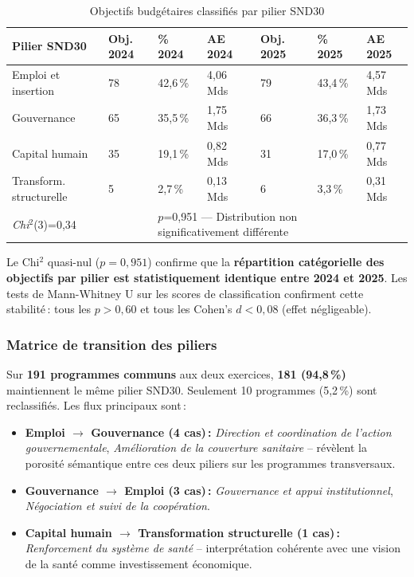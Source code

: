\documentclass[12pt, a4paper]{article}
\begin{document}
\begin{table}[H]
\centering
\caption{Objectifs budgétaires classifiés par pilier SND30}
\label{tab:snd30}
\small
\begin{tabularx}{\linewidth}{lXXXXXX}
\toprule
\rowcolor{bleuCMR!15}
\textbf{Pilier SND30} & \textbf{Obj. 2024} & \textbf{\% 2024} & \textbf{AE 2024} & \textbf{Obj. 2025} & \textbf{\% 2025} & \textbf{AE 2025} \\
\midrule
Emploi et insertion & 78 & 42,6\,\% & 4,06 Mds & 79 & 43,4\,\% & 4,57 Mds \\
Gouvernance & 65 & 35,5\,\% & 1,75 Mds & 66 & 36,3\,\% & 1,73 Mds \\
Capital humain & 35 & 19,1\,\% & 0,82 Mds & 31 & 17,0\,\% & 0,77 Mds \\
Transform. structurelle & 5 & 2,7\,\% & 0,13 Mds & 6 & 3,3\,\% & 0,31 Mds \\
\midrule
\multicolumn{2}{l}{\textit{Chi}$^2$(3)=0,34} & \multicolumn{4}{l}{$p$=0,951 — Distribution non significativement différente} & \\
\bottomrule
\end{tabularx}
\end{table}

Le Chi$^2$ quasi-nul ($p=0{,}951$) confirme que la \textbf{répartition catégorielle des objectifs 
par pilier est statistiquement identique entre 2024 et 2025}. Les tests de Mann-Whitney U sur les 
scores de classification confirment cette stabilité\,: tous les $p > 0{,}60$ et tous les 
Cohen's $d < 0{,}08$ (effet négligeable).

\subsubsection{Matrice de transition des piliers}

Sur \textbf{191 programmes communs} aux deux exercices, \textbf{181 (94,8\,\%)} maintiennent le même 
pilier SND30. Seulement 10 programmes (5,2\,\%) sont reclassifiés. Les flux principaux sont\,:

\begin{itemize}[noitemsep]
  \item \textbf{Emploi $\to$ Gouvernance (4 cas)\,:} \textit{Direction et coordination de l'action 
  gouvernementale}, \textit{Amélioration de la couverture sanitaire} -- révèlent la porosité sémantique 
  entre ces deux piliers sur les programmes transversaux.
  \item \textbf{Gouvernance $\to$ Emploi (3 cas)\,:} \textit{Gouvernance et appui institutionnel}, 
  \textit{Négociation et suivi de la coopération}.
  \item \textbf{Capital humain $\to$ Transformation structurelle (1 cas)\,:} \textit{Renforcement du 
  système de santé} -- interprétation cohérente avec une vision de la santé comme investissement économique.
\end{itemize}
\end{document}
